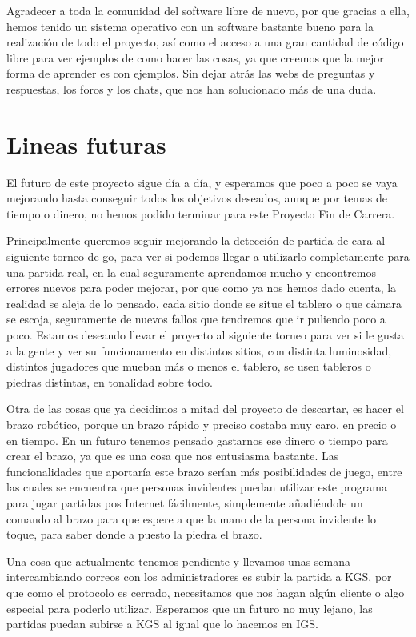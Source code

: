 \documentclass[12pt,a4paper]{report}
\begin{document}
Agradecer a toda la comunidad del software libre de nuevo, por que gracias a
ella, hemos tenido un sistema operativo con un software bastante bueno para la
realización de todo el proyecto, así como el acceso a una gran cantidad de
código libre para ver ejemplos de como hacer las cosas, ya que creemos que la
mejor forma de aprender es con ejemplos. Sin dejar atrás las webs de preguntas y
respuestas, los foros y los chats, que nos han solucionado más de una duda. 





\chapter{Lineas futuras}

El futuro de este proyecto sigue día a día, y esperamos que poco a poco se vaya
mejorando hasta conseguir todos los objetivos deseados, aunque por temas de
tiempo o dinero, no hemos podido terminar para este Proyecto Fin de Carrera. 

Principalmente queremos seguir mejorando la detección de partida de cara al
siguiente torneo de go, para ver si podemos llegar a utilizarlo completamente
para una partida real, en la cual seguramente aprendamos mucho y encontremos
errores nuevos para poder mejorar, por que como ya nos hemos dado cuenta, la
realidad se aleja de lo pensado, cada sitio donde se situe el tablero o que
cámara se escoja, seguramente de nuevos fallos que tendremos que ir puliendo
poco a poco. Estamos deseando llevar el proyecto al siguiente torneo para ver si
le gusta a la gente y ver su funcionamento en distintos sitios, con distinta
luminosidad, distintos jugadores que mueban más o menos el tablero, se usen
tableros o piedras distintas, en tonalidad sobre todo. 

Otra de las cosas que ya decidimos a mitad del proyecto de descartar, es hacer
el brazo robótico, porque un brazo rápido y preciso costaba muy caro, en precio
o en tiempo. En un futuro tenemos pensado gastarnos ese dinero o tiempo para
crear el brazo, ya que es una cosa que nos entusiasma bastante. Las
funcionalidades que aportaría este brazo serían más posibilidades de juego,
entre las cuales se encuentra que personas invidentes puedan utilizar este
programa para jugar partidas pos Internet fácilmente, simplemente añadiéndole un
comando al brazo para que espere a que la mano de la persona invidente lo toque,
para saber donde a puesto la piedra el brazo. 

Una cosa que actualmente tenemos pendiente y llevamos unas semana intercambiando
correos con los administradores es subir la partida a KGS, por que como el
protocolo es cerrado, necesitamos que nos hagan algún cliente o algo especial
para poderlo utilizar. Esperamos que un futuro no muy lejano, las partidas
puedan subirse a KGS al igual que lo hacemos en IGS. 
\end{document}
